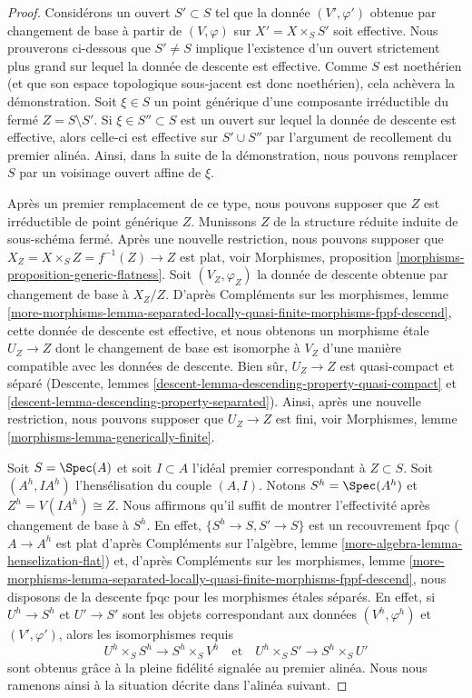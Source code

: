 \begin{proof}
\medskip\noindent
Considérons un ouvert $S' \subset S$ tel que la donnée $(V', \varphi')$ obtenue
par changement de base à partir de $(V, \varphi)$ sur $X' = X \times_S S'$ soit effective. Nous prouverons ci-dessous
que $S' \not = S$ implique l'existence d'un ouvert strictement plus grand sur
lequel la donnée de descente est effective. Comme $S$ est noethérien (et que son
espace topologique sous-jacent est donc noethérien), cela achèvera la démonstration.
Soit $\xi \in S$ un point générique d'une composante irréductible du
fermé $Z = S \setminus S'$.
Si $\xi \in S'' \subset S$ est un ouvert sur lequel la donnée de descente est
effective, alors celle-ci est effective sur
$S' \cup S''$ par l'argument de recollement du premier alinéa. Ainsi,
dans la suite de la démonstration, nous pouvons remplacer $S$ par un voisinage ouvert affine
de $\xi$.

\medskip\noindent
Après un premier remplacement de ce type, nous pouvons supposer que $Z$ est irréductible
de point générique $Z$. Munissons $Z$ de la structure réduite induite
de sous-schéma fermé. Après une nouvelle restriction, nous pouvons supposer que
$X_Z = X \times_S Z = f^{-1}(Z) \to Z$ est plat, voir
Morphismes, proposition \ref{morphisms-proposition-generic-flatness}.
Soit $(V_Z, \varphi_Z)$ la donnée de descente obtenue par changement de base à $X_Z/Z$.
D'après Compléments sur les morphismes, lemme
\ref{more-morphisms-lemma-separated-locally-quasi-finite-morphisms-fppf-descend},
cette donnée de descente est effective, et nous obtenons un morphisme \'etale
$U_Z \to Z$ dont le changement de base est isomorphe à $V_Z$ d'une manière
compatible avec les données de descente.
Bien sûr, $U_Z \to Z$ est quasi-compact et séparé
(Descente, lemmes \ref{descent-lemma-descending-property-quasi-compact} et
\ref{descent-lemma-descending-property-separated}).
Ainsi, après une nouvelle restriction, nous pouvons supposer
que $U_Z \to Z$ est fini, voir
Morphismes, lemme \ref{morphisms-lemma-generically-finite}.

\medskip\noindent
Soit $S = \Spec(A)$ et soit $I \subset A$ l'idéal premier correspondant
à $Z \subset S$. Soit $(A^h, IA^h)$ l'hensélisation du couple
$(A, I)$. Notons $S^h = \Spec(A^h)$ et $Z^h = V(IA^h) \cong Z$.
Nous affirmons qu'il suffit de montrer l'effectivité après changement de base à
$S^h$. En effet, $\{S^h \to S, S' \to S\}$ est un recouvrement fpqc
($A \to A^h$ est plat d'après Compléments sur l'algèbre, lemme
\ref{more-algebra-lemma-henselization-flat}) et,
d'après Compléments sur les morphismes, lemme
\ref{more-morphisms-lemma-separated-locally-quasi-finite-morphisms-fppf-descend},
nous disposons de la descente fpqc pour les morphismes \'etales séparés.
En effet, si $U^h \to S^h$ et $U' \to S'$ sont les objets
correspondant aux données $(V^h, \varphi^h)$ et
$(V', \varphi')$, alors les isomorphismes requis
$$
U^h \times_S S^h \to S^h \times_S V^h
\quad\text{et}\quad
U^h \times_S S' \to S^h \times_S U'
$$
sont obtenus grâce à la pleine fidélité signalée au premier
alinéa. Nous nous ramenons ainsi à la situation décrite dans
l'alinéa suivant.


\end{proof}
